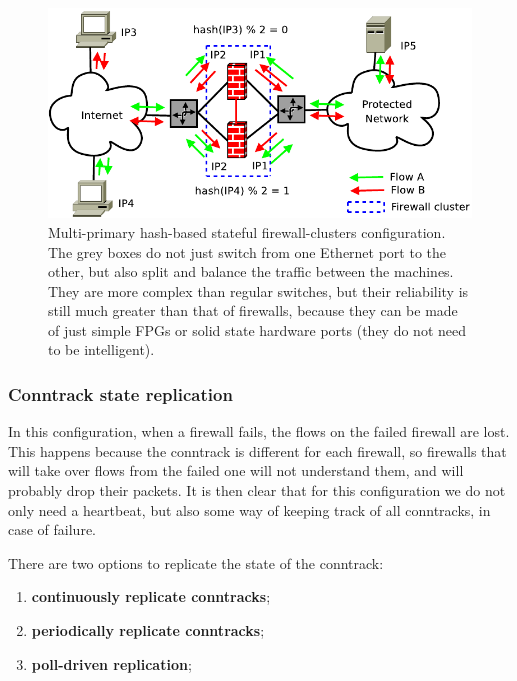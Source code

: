 \begin{figure}[h]
    \centering
    \includegraphics[scale=0.7]{img/multiprimary_backup_fw.png}
    \decoRule
    \caption{Multi-primary hash-based stateful firewall-clusters configuration. The grey boxes do not just switch from one Ethernet port to the other, but also split and balance the traffic between the machines. They are more complex than regular switches, but their reliability is still much greater than that of firewalls, because they can be made of just simple FPGs or solid state hardware ports (they do not need to be intelligent).}
    \label{fig:multiprimary_backup_fw}
\end{figure}


\subsubsection*{Conntrack state replication}
In this configuration, when a firewall fails, the flows on the failed firewall are lost. This happens because the conntrack is different for each firewall, so firewalls that will take over flows from the failed one will not understand them, and will probably drop their packets. It is then clear that for this configuration we do not only need a heartbeat, but also some way of keeping track of all conntracks, in case of failure.

There are two options to replicate the state of the conntrack:

\begin{enumerate}
    \item \textbf{continuously replicate conntracks};
    \item \textbf{periodically replicate conntracks};
    \item \textbf{poll-driven replication};
\end{enumerate}

